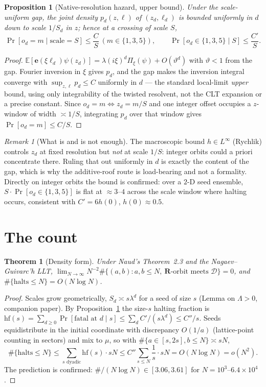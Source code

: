 \documentclass[11pt]{article}
\newtheorem{theorem}{Theorem}\newtheorem{lemma}{Lemma}
\newtheorem{proposition}{Proposition}\newtheorem{corollary}{Corollary}
\theoremstyle{definition}\newtheorem{definition}{Definition}
\theoremstyle{remark}\newtheorem{remark}{Remark}
\newcommand{\R}{\mathbf{R}}\newcommand{\Z}{\mathbb{Z}}\newcommand{\Leb}{\mathrm{Leb}}
\newcommand{\D}{\mathcal D}\newcommand{\Lop}{\mathcal L}\newcommand{\e}{\mathbf e}
\begin{document}
\begin{proposition}[Native-resolution hazard, upper bound]\label{p:hazard}
Under the scale-uniform gap, the joint density $p_d(z,\ell)$ of $(z_d,\ell_d)$
is bounded uniformly in $d$ down to scale $1/S_d$ in $z$; hence at a crossing of
scale $S$,
\[
\Pr[o_d=m\mid \mathrm{scale}=S]\le \frac{C}{S}\ (m\in\{1,3,5\}),\qquad
\Pr[o_d\in\{1,3,5\}\mid S]\le\frac{C'}{S}.
\]
\end{proposition}
\begin{proof}
$\mathbb E[\e(\xi\ell_d)\psi(z_d)]=\lambda(i\xi)^d\Pi_\xi(\psi)+O(\vartheta^d)$
with $\vartheta<1$ from the gap. Fourier inversion in $\xi$ gives $p_d$, and the
gap makes the inversion integral converge with $\sup_{z,\ell}p_d\le C$ uniformly
in $d$ --- the standard local-limit \emph{upper} bound, using only integrability
of the twisted resolvent, not the CLT expansion or a precise constant. Since
$o_d=m\iff z_d=m/S$ and one integer offset occupies a $z$-window of width
$\asymp1/S$, integrating $p_d$ over that window gives $\Pr[o_d=m]\le C/S$.
\end{proof}
\begin{remark}[What is and is not enough]\label{r:notenough}
The macroscopic bound $h\in L^\infty$ (Rychlik) controls $z_d$ at fixed
resolution but \emph{not} at scale $1/S$: integer orbits could a priori
concentrate there. Ruling that out uniformly in $d$ is exactly the content of
the gap, which is why the additive-roof route is load-bearing and not a
formality. Directly on integer orbits the bound is confirmed: over a
$2$-D seed ensemble, $S\cdot\Pr[o_d\in\{1,3,5\}]$ is flat at $\approx3$--$4$
across the scale window where halting occurs, consistent with $C'=6h(0)$,
$h(0)\approx0.5$.
\end{remark}

\section{The count}\label{sec:count}
\begin{theorem}[Density form]\label{t:main}
Under Naud's Theorem~2.3 and the Nagaev--Guivarc'h LLT,
$\displaystyle\lim_{N\to\infty}N^{-2}\#\{(a,b):a,b\le N,\ \R\text{-orbit meets }
\D\}=0$, and $\#\{\text{halts}\le N\}=O(N\log N)$.
\end{theorem}
\begin{proof}
Scales grow geometrically, $S_d\asymp s\lambda^d$ for a seed of size $s$
(Lemma on $\Lambda>0$, companion paper). By Proposition~\ref{p:hazard} the
size-$s$ halting fraction is
$\mathrm{hf}(s)=\sum_{d\ge0}\Pr[\text{fatal at }d\mid s]\le\sum_d C'/(s\lambda^d)
\le C''/s$. Seeds equidistribute in the initial coordinate with discrepancy
$O(1/a)$ (lattice-point counting in sectors) and mix to $\mu$, so with
$\#\{a\in[s,2s],b\le N\}\asymp sN$,
\[
\#\{\text{halts}\le N\}\le\sum_{s\text{ dyadic}}\mathrm{hf}(s)\cdot sN
\le C''\sum_{s\le N}\frac{1}{s}\cdot sN=O(N\log N)=o(N^2).
\]
The prediction is confirmed: $\#/(N\log N)\in[3.06,3.61]$ for
$N=10^3$--$6.4\times10^4$.
\end{proof}
\end{document}
